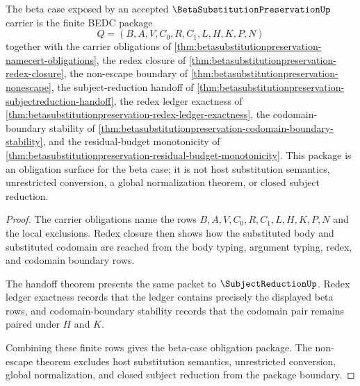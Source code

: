 \begin{theorem}
\label{thm:betasubstitutionpreservation-beta-case-obligation-package}
The beta case exposed by an accepted $\BetaSubstitutionPreservationUp$ carrier is the finite BEDC package
$$
Q=(B,A,V,C_0,R,C_1,L,H,K,P,N)
$$
together with the carrier obligations of \autoref{thm:betasubstitutionpreservation-namecert-obligations}, the redex closure of \autoref{thm:betasubstitutionpreservation-redex-closure}, the non-escape boundary of \autoref{thm:betasubstitutionpreservation-nonescape}, the subject-reduction handoff of \autoref{thm:betasubstitutionpreservation-subjectreduction-handoff}, the redex ledger exactness of \autoref{thm:betasubstitutionpreservation-redex-ledger-exactness}, the codomain-boundary stability of \autoref{thm:betasubstitutionpreservation-codomain-boundary-stability}, and the residual-budget monotonicity of \autoref{thm:betasubstitutionpreservation-residual-budget-monotonicity}. This package is an obligation surface for the beta case; it is not host substitution semantics, unrestricted conversion, a global normalization theorem, or closed subject reduction.
\end{theorem}
\begin{proof}
The carrier obligations name the rows $B,A,V,C_0,R,C_1,L,H,K,P,N$ and the local exclusions. Redex closure then shows how the substituted body and substituted codomain are reached from the body typing, argument typing, redex, and codomain boundary rows.

The handoff theorem presents the same packet to $\SubjectReductionUp$. Redex ledger exactness records that the ledger contains precisely the displayed beta rows, and codomain-boundary stability records that the codomain pair remains paired under $H$ and $K$.

Combining these finite rows gives the beta-case obligation package. The non-escape theorem excludes host substitution semantics, unrestricted conversion, global normalization, and closed subject reduction from the package boundary.
\end{proof}


